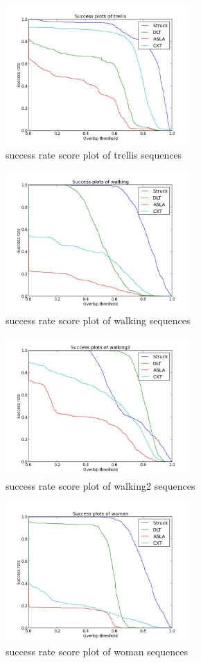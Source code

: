 \documentclass{acm_proc_article-sp}
\begin{document}
\begin{figure}[hbt]
    \includegraphics[width=200pt]{trellis.jpg}
    \caption{success rate score plot of trellis sequences}
    \label{fig:trellis}
\end{figure}

\begin{figure}[hbt]
    \includegraphics[width=200pt]{walking.jpg}
    \caption{success rate score plot of walking sequences}
    \label{fig:walking}
\end{figure}

\begin{figure}[hbt]
    \includegraphics[width=200pt]{walking2.jpg}
    \caption{success rate score plot of walking2 sequences}
    \label{fig:walking2}
\end{figure}

\begin{figure}[hbt]
  \includegraphics[width=200pt]{woman.jpg}
  \caption{success rate score plot of woman sequences}
  \label{fig:woman}
\end{figure}
\end{document}
